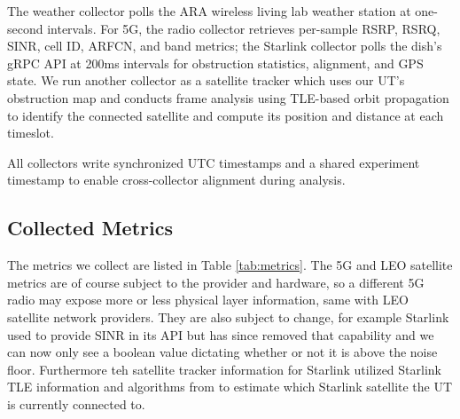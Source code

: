 \documentclass[12pt]{article}
\begin{document}
The weather collector polls the ARA wireless living lab weather station at one-second intervals. For 5G, the radio collector retrieves per-sample RSRP, RSRQ, SINR, cell ID, ARFCN, and band metrics; the Starlink collector polls the dish's gRPC API at 200ms intervals for obstruction statistics, alignment, and GPS state. We run another collector as a satellite tracker which uses our UT's obstruction map and conducts frame analysis using TLE-based orbit propagation to identify the connected satellite and compute its position and distance at each timeslot.

All collectors write synchronized UTC timestamps and a shared experiment timestamp to enable cross-collector alignment during analysis.

\subsection{Collected Metrics}

The metrics we collect are listed in Table \ref{tab:metrics}. The 5G and LEO satellite metrics are of course subject to the provider and hardware, so a different 5G radio may expose more or less physical layer information, same with LEO satellite network providers. They are also subject to change, for example Starlink used to provide SINR in its API but has since removed that capability and we can now only see a boolean value dictating whether or not it is above the noise floor. Furthermore teh satellite tracker information for Starlink utilized Starlink TLE information and algorithms from \cite{pan_measuring_2024} to estimate which Starlink satellite the UT is currently connected to. 
\end{document}
